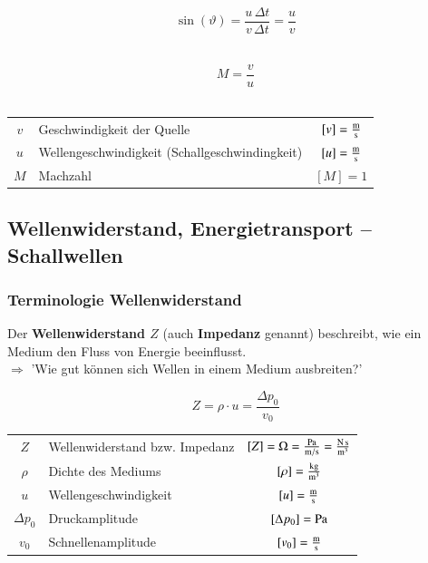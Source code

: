 \begin{minipage}{0.48\linewidth}
$$ \boxed{ \sin(\vartheta) = \frac{u \, \Delta t}{v \, \Delta t} = \frac{u}{v} } $$ \\
\end{minipage}
\hfill
\begin{minipage}{0.48\linewidth}
$$ \boxed{ M = \frac{v}{u} } $$ \\
\end{minipage}


\renewcommand{\arraystretch}{1.1}
\begin{tabular}{clc}
$v$ & Geschwindigkeit der Quelle & $[v] = \frac{\mathrm{m}}{\mathrm{s}}$ \\
$u$ & Wellengeschwindigkeit (Schallgeschwindingkeit) & $[u] = \frac{\mathrm{m}}{\mathrm{s}}$ \\
$M$ & Machzahl & $[M] = 1$
\end{tabular}
\renewcommand{\arraystretch}{1}



\subsection{Wellenwiderstand, Energietransport -- Schallwellen}

\subsubsection{Terminologie Wellenwiderstand}
Der \textbf{Wellenwiderstand $Z$} (auch \textbf{Impedanz} genannt) beschreibt, wie ein Medium den Fluss
von Energie beeinflusst. \\
\vspace{0.3cm}
$\Rightarrow$ 'Wie gut können sich Wellen in einem Medium ausbreiten?'

$$ \boxed{ Z = \rho \cdot u = \frac{\Delta p_0}{v_0} } $$

\vspace{0.2cm}

\renewcommand{\arraystretch}{1.2}
\begin{tabular}{clc}
$Z$ & Wellenwiderstand bzw. Impedanz & $[Z] = \mathrm{\Omega} = \frac{\mathrm{Pa}}{\mathrm{m} / \mathrm{s}} = \frac{\mathrm{N} \, \mathrm{s}}{\mathrm{m}^3}$ \\
$\rho$ & Dichte des Mediums & $[\rho] = \frac{\mathrm{kg}}{\mathrm{m}^3}$ \\
$u$ & Wellengeschwindigkeit & $[u] = \frac{\mathrm{m}}{\mathrm{s}}$ \\
$\Delta p_0$ & Druckamplitude & $[\Delta p_0] = \mathrm{Pa}$ \\
$v_0$ & Schnellenamplitude & $[v_0] = \frac{\mathrm{m}}{\mathrm{s}}$
\end{tabular}
\renewcommand{\arraystretch}{1}




